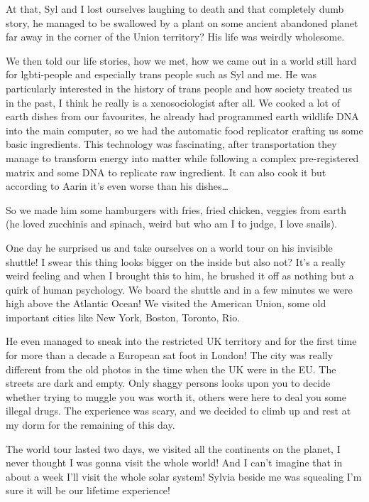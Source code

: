 \documentclass[hidelinks,12pt,a4paper]{book}
\begin{document}
At that, Syl and I lost ourselves laughing to death and that completely dumb story, he managed to be swallowed by a plant 
on some ancient abandoned planet far away in the corner of the Union territory? His life was weirdly wholesome.\par
\bigskip
We then told our life stories, how we met, how we came out in a world still hard for lgbti-people and especially trans 
people such as Syl and me. He was particularly interested in the history of trans people and how society treated us in 
the past, I think he really is a xenosociologist after all. We cooked a lot of earth dishes from our favourites, he already
 had programmed earth wildlife DNA into the main computer, so we had the automatic food replicator crafting us some basic 
 ingredients. This technology was fascinating, after transportation they manage to transform energy into matter while 
 following a complex pre-registered matrix and some DNA to replicate raw ingredient. It can also cook it but 
 according to Aarin it's even worse than his dishes…\par
 \bigskip

So we made him some hamburgers with fries, fried chicken, veggies from earth (he loved zucchinis and spinach, 
weird but who am I to judge, I love snails). \par
\bigskip

One day he surprised us and take ourselves on a world tour on his invisible shuttle! I swear this thing looks 
bigger on the inside but also not? It's a really weird feeling and when I brought this to him, he brushed 
it off as nothing but a quirk of human psychology. We board the shuttle and in a few minutes we were high above 
the Atlantic Ocean! We visited the American Union, some old important cities like New York, Boston, Toronto, Rio.\par
\bigskip

He even managed to sneak into the restricted UK territory and for the first time for more than a decade a European sat 
foot in London! The city was really different from the old photos in the time when the UK were in the EU. 
The streets are dark and empty. Only shaggy persons looks upon you to decide whether trying to muggle you 
was worth it, others were here to deal you some illegal drugs. The experience was scary, and we decided to 
climb up and rest at my dorm for the remaining of this day.\par
\bigskip

The world tour lasted two days, we visited all the continents on the planet, I never thought I was gonna visit the whole 
world! And I can't imagine that in about a week I'll visit the whole solar system! Sylvia beside me was squealing 
 I'm sure it will be our lifetime experience!\par
 \bigskip
\end{document}
